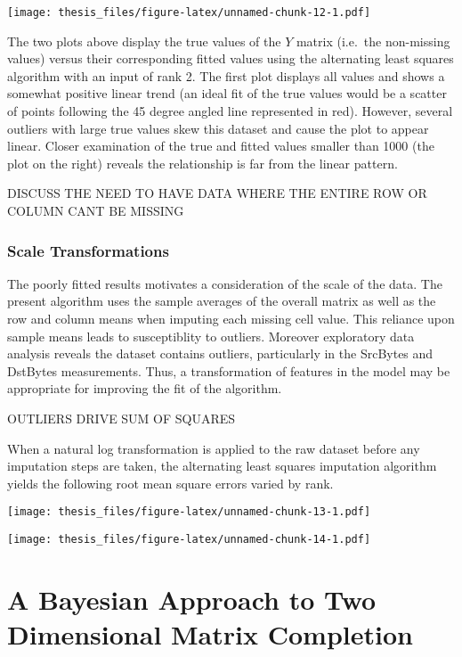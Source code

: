 \documentclass[12pt,twoside]{dukestatscithesis}
\theoremstyle{definition}
\theoremstyle{definition}
\theoremstyle{definition}
\theoremstyle{remark}
\begin{document}
\texttt{[image: thesis\_files/figure-latex/unnamed-chunk-12-1.pdf]}

The two plots above display the true values of the \(Y\) matrix
(i.e.~the non-missing values) versus their corresponding fitted values
using the alternating least squares algorithm with an input of rank 2.
The first plot displays all values and shows a somewhat positive linear
trend (an ideal fit of the true values would be a scatter of points
following the 45 degree angled line represented in red). However,
several outliers with large true values skew this dataset and cause the
plot to appear linear. Closer examination of the true and fitted values
smaller than 1000 (the plot on the right) reveals the relationship is
far from the linear pattern.

DISCUSS THE NEED TO HAVE DATA WHERE THE ENTIRE ROW OR COLUMN CANT BE
MISSING

\subsection{Scale Transformations}\label{scale-transformations}

The poorly fitted results motivates a consideration of the scale of the
data. The present algorithm uses the sample averages of the overall
matrix as well as the row and column means when imputing each missing
cell value. This reliance upon sample means leads to susceptiblity to
outliers. Moreover exploratory data analysis reveals the dataset
contains outliers, particularly in the SrcBytes and DstBytes
measurements. Thus, a transformation of features in the model may be
appropriate for improving the fit of the algorithm.

OUTLIERS DRIVE SUM OF SQUARES

When a natural log transformation is applied to the raw dataset before
any imputation steps are taken, the alternating least squares imputation
algorithm yields the following root mean square errors varied by rank.

\texttt{[image: thesis\_files/figure-latex/unnamed-chunk-13-1.pdf]}

\texttt{[image: thesis\_files/figure-latex/unnamed-chunk-14-1.pdf]}

\chapter{A Bayesian Approach to Two Dimensional Matrix
Completion}\label{a-bayesian-approach-to-two-dimensional-matrix-completion}
\end{document}
